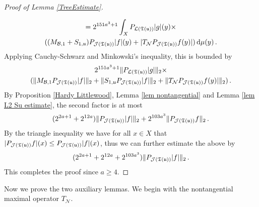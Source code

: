 {\begin{proof}[Proof of Lemma \ref{TreeEstimate}]
\begin{multline*}
    \end{multline*}
    \begin{multline*}
        = 2^{151a^3 + 1} \int_X P_{\mathcal{L}(\mathfrak T(\mathfrak u))}|g|(y)\times \\((M_{\mathcal{B},1}+S_{1,\mathfrak u})P_{\mathcal{J}(\mathfrak T(\mathfrak u))}|f|(y)+|T_{\mathcal{N}}P_{\mathcal{J}(\mathfrak T(\mathfrak u))}f(y)| ) \, \mathrm{d}\mu(y)\,.
    \end{multline*}
    Applying Cauchy-Schwarz and Minkowski's inequality, this is bounded by
    \begin{multline*}
        2^{151a^3 + 1} \|P_{\mathcal{L}(\mathfrak T(\mathfrak u))}|g|\|_2 \times \\(\|M_{\mathcal{B},1}P_{\mathcal{J}(\mathfrak T(\mathfrak u))}|f|\|_2 + \|S_{1,\mathfrak u}P_{\mathcal{J}(\mathfrak T(\mathfrak u))}|f|\|_2 + \|T_{\mathcal{N}}P_{\mathcal{J}(\mathfrak T(\mathfrak u))}f(y)|\|_2)\,.
    \end{multline*}
    By Proposition \ref{Hardy Littlewood}, Lemma \ref{lem nontangential} and Lemma \ref{lem L2 Su estimate}, the second factor is at most
    $$
        (2^{2a+1} + 2^{12a})\|P_{\mathcal{J}(\mathfrak T(\mathfrak u))}|f|\|_2 + 2^{103a^3} \|P_{\mathcal{J}(\mathfrak T(\mathfrak u))}f\|_2\,.
    $$
    By the triangle inequality we have for all $x \in X$ that $|P_{\mathcal{J}(\mathfrak T(\mathfrak u))}f|(x) \le P_{\mathcal{J}(\mathfrak T(\mathfrak u))}|f|(x)$, thus we can further estimate the above by
    $$
        (2^{2a+1} + 2^{12a} + 2^{103a^3}) \|P_{\mathcal{J}(\mathfrak T(\mathfrak u))}|f|\|_2\,.
    $$
    This completes the proof since $a \ge 4$.
\end{proof}

Now we prove the two auxiliary lemmas. We begin with the nontangential maximal operator $T_{\mathcal{N}}$.

}
